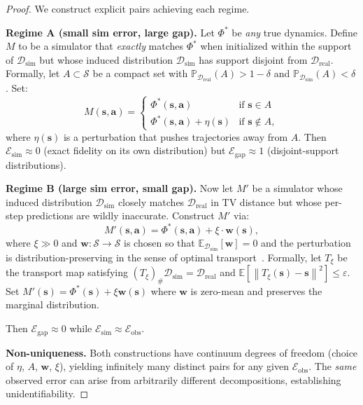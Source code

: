 \documentclass[11pt,twocolumn]{article}
\theoremstyle{definition}
\newcommand{\E}{\mathbb{E}}
\newcommand{\Pbb}{\mathbb{P}}
\newcommand{\cS}{\mathcal{S}}
\newcommand{\cD}{\mathcal{D}}
\newcommand{\norm}[1]{\left\lVert#1\right\rVert}
\begin{document}
\begin{proof}
We construct explicit pairs achieving each regime.

\medskip\noindent
\textbf{Regime A (small sim error, large gap).}
Let $\Phi^*$ be \emph{any} true dynamics.  Define $M$ to be a simulator that
\emph{exactly} matches $\Phi^*$ when initialized within the support of
$\cD_{\text{sim}}$ but whose induced distribution $\cD_{\text{sim}}$ has
support disjoint from $\cD_{\text{real}}$.  Formally, let $A \subset \cS$ be
a compact set with $\Pbb_{\cD_{\text{real}}}(A) > 1-\delta$ and
$\Pbb_{\cD_{\text{sim}}}(A) < \delta$.  Set:
\begin{equation}
  M(\mathbf{s}, \mathbf{a}) =
  \begin{cases}
    \Phi^*(\mathbf{s}, \mathbf{a}) & \text{if } \mathbf{s} \in A \\
    \Phi^*(\mathbf{s}, \mathbf{a}) + \eta(\mathbf{s}) & \text{if } \mathbf{s} \notin A,
  \end{cases}
\end{equation}
where $\eta(\mathbf{s})$ is a perturbation that pushes trajectories away from
$A$.  Then $\mathcal{E}_{\text{sim}} \approx 0$ (exact fidelity on its own
distribution) but $\mathcal{E}_{\text{gap}} \approx 1$
(disjoint-support distributions).

\medskip\noindent
\textbf{Regime B (large sim error, small gap).}
Now let $M'$ be a simulator whose induced distribution $\cD_{\text{sim}}$
closely matches $\cD_{\text{real}}$ in TV distance but whose per-step
predictions are wildly inaccurate.  Construct $M'$ via:
\begin{equation}
  M'(\mathbf{s}, \mathbf{a}) = \Phi^*(\mathbf{s}, \mathbf{a}) +
  \xi \cdot \mathbf{w}(\mathbf{s}),
\end{equation}
where $\xi \gg 0$ and $\mathbf{w}: \cS \to \cS$ is chosen so that
$\E_{\cD_{\text{sim}}}[\mathbf{w}] = 0$ and the perturbation is
distribution-preserving in the sense of optimal transport~\cite{villani2009}.
Formally, let $T_\xi$ be the transport map satisfying
$(T_\xi)_\# \cD_{\text{sim}} = \cD_{\text{real}}$ and
$\E[\norm{T_\xi(\mathbf{s}) - \mathbf{s}}^2] \le \varepsilon$.
Set $M'(\mathbf{s}) = \Phi^*(\mathbf{s}) + \xi\mathbf{w}(\mathbf{s})$ where
$\mathbf{w}$ is zero-mean and preserves the marginal distribution.

Then $\mathcal{E}_{\text{gap}} \approx 0$ while
$\mathcal{E}_{\text{sim}} \approx \mathcal{E}_{\text{obs}}$.

\medskip\noindent
\textbf{Non-uniqueness.}
Both constructions have continuum degrees of freedom (choice of $\eta$, $A$,
$\mathbf{w}$, $\xi$), yielding infinitely many distinct pairs for any given
$\mathcal{E}_{\text{obs}}$.  The \emph{same} observed error can arise from
arbitrarily different decompositions, establishing unidentifiability.


\end{proof}
\end{document}
